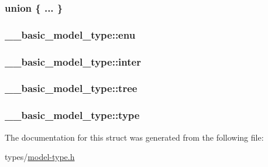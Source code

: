 \subsubsection[{\texorpdfstring{"@1}{@1}}]{\setlength{\rightskip}{0pt plus 5cm}union \{ ... \} }\hypertarget{struct____basic__model__type_af95e8ed14a442905f43af0597adfa8fd}{}\label{struct____basic__model__type_af95e8ed14a442905f43af0597adfa8fd}
\subsubsection[{\texorpdfstring{enu}{enu}}]{ \+\_\+\+\_\+basic\+\_\+model\+\_\+type\+::enu}\hypertarget{struct____basic__model__type_a85c1057180208db35284216b538069aa}{}\label{struct____basic__model__type_a85c1057180208db35284216b538069aa}
\subsubsection[{\texorpdfstring{inter}{inter}}]{ \+\_\+\+\_\+basic\+\_\+model\+\_\+type\+::inter}\hypertarget{struct____basic__model__type_ab8d5678611d08643553531e646f4488a}{}\label{struct____basic__model__type_ab8d5678611d08643553531e646f4488a}
\subsubsection[{\texorpdfstring{tree}{tree}}]{ \+\_\+\+\_\+basic\+\_\+model\+\_\+type\+::tree}\hypertarget{struct____basic__model__type_ad5062e379e5e17e5859a60ae73071646}{}\label{struct____basic__model__type_ad5062e379e5e17e5859a60ae73071646}
\subsubsection[{\texorpdfstring{type}{type}}]{ \+\_\+\+\_\+basic\+\_\+model\+\_\+type\+::type}\hypertarget{struct____basic__model__type_a83232389e229881b11f9a0465d44f3c6}{}\label{struct____basic__model__type_a83232389e229881b11f9a0465d44f3c6}


The documentation for this struct was generated from the following file\+:\begin{DoxyCompactItemize}
\item 
types/\hyperlink{model-type_8h}{model-\/type.\+h}\end{DoxyCompactItemize}
